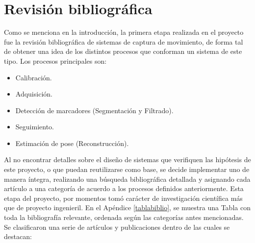 \chapter{Revisión bibliográfica}
\label{invBiblio}

Como se menciona en la introducción, la primera etapa realizada en el proyecto fue la revisión bibliográfica de sistemas de captura de movimiento, de forma tal de obtener una idea de los distintos procesos que conforman un sistema de este tipo. Los procesos principales son:

\begin{itemize}
	\item Calibración.
	\item Adquisición.
	\item Detección de marcadores (Segmentación y Filtrado).
	\item Seguimiento.
	\item Estimación de pose (Reconstrucción).
\end{itemize}

Al no encontrar detalles sobre el diseño de sistemas que verifiquen las hipótesis de este proyecto, o que puedan reutilizarse como base, se decide implementar uno de manera íntegra, realizando una búsqueda bibliográfica detallada y asignando cada artículo a una categoría de acuerdo a los procesos definidos anteriormente. Esta etapa del proyecto, por momentos tomó carácter de investigación científica más que de proyecto ingenieril. 
En el Apéndice \ref{tablabiblio}, se muestra una Tabla con toda la bibliografía relevante, ordenada según las categorías antes mencionadas.
\\ 

Se clasificaron una serie de artículos y publicaciones dentro de las cuales se destacan:


